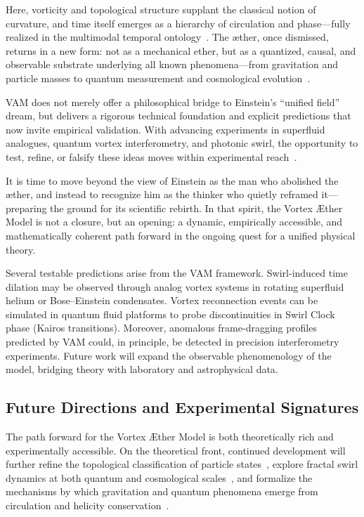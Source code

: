 Here, vorticity and topological structure supplant the classical notion of curvature, and time itself emerges as a hierarchy of circulation and phase—fully realized in the multimodal temporal ontology~\cite{VAM-13, VAM-15}. The æther, once dismissed, returns in a new form: not as a mechanical ether, but as a quantized, causal, and observable substrate underlying all known phenomena—from gravitation and particle masses to quantum measurement and cosmological evolution~\cite{VAM-8, VAM-11, VAM-15, VAM-17.1}.


VAM does not merely offer a philosophical bridge to Einstein’s “unified field” dream, but delivers a rigorous technical foundation and explicit predictions that now invite empirical validation. With advancing experiments in superfluid analogues, quantum vortex interferometry, and photonic swirl, the opportunity to test, refine, or falsify these ideas moves within experimental reach~\cite{VAM-2, VAM-13, VAM-15}.

It is time to move beyond the view of Einstein as the man who abolished the æther, and instead to recognize him as the thinker who quietly reframed it—preparing the ground for its scientific rebirth. In that spirit, the Vortex Æther Model is not a closure, but an opening: a dynamic, empirically accessible, and mathematically coherent path forward in the ongoing quest for a unified physical theory.

Several testable predictions arise from the VAM framework. Swirl-induced time dilation may be observed through analog vortex systems in rotating superfluid helium or Bose–Einstein condensates. Vortex reconnection events can be simulated in quantum fluid platforms to probe discontinuities in Swirl Clock phase (Kairos transitions). Moreover, anomalous frame-dragging profiles predicted by VAM could, in principle, be detected in precision interferometry experiments. Future work will expand the observable phenomenology of the model, bridging theory with laboratory and astrophysical data.


\subsection*{Future Directions and Experimental Signatures}

The path forward for the Vortex Æther Model is both theoretically rich and experimentally accessible. On the theoretical front, continued development will further refine the topological classification of particle states~\cite{VAM-11, VAM-14}, explore fractal swirl dynamics at both quantum and cosmological scales~\cite{VAM-12, VAM-9}, and formalize the mechanisms by which gravitation and quantum phenomena emerge from circulation and helicity conservation~\cite{VAM-13, VAM-15}.

